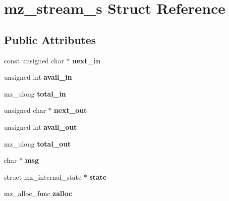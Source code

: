 \hypertarget{structmz__stream__s}{}\section{mz\+\_\+stream\+\_\+s Struct Reference}
\label{structmz__stream__s}
\subsection*{Public Attributes}
\begin{DoxyCompactItemize}
\item 
\mbox{\label{structmz__stream__s_aa75ed42cc83b0f74d7fcce6299439307}} 
const unsigned char $\ast$ {\bfseries next\+\_\+in}
\item 
\mbox{\label{structmz__stream__s_aafcd4c220622ede6d54015f1fbdadd9e}} 
unsigned int {\bfseries avail\+\_\+in}
\item 
\mbox{\label{structmz__stream__s_abfa083eb7707360c33389ec12fadf376}} 
mz\+\_\+ulong {\bfseries total\+\_\+in}
\item 
\mbox{\label{structmz__stream__s_a2c569383efce3b9d9e7c02e3e03941bc}} 
unsigned char $\ast$ {\bfseries next\+\_\+out}
\item 
\mbox{\label{structmz__stream__s_a9092fed61f7be520fb1bbcf152905ee8}} 
unsigned int {\bfseries avail\+\_\+out}
\item 
\mbox{\label{structmz__stream__s_a5cf2c15cc49a99ee7d541375798a3e27}} 
mz\+\_\+ulong {\bfseries total\+\_\+out}
\item 
\mbox{\label{structmz__stream__s_ad4095b25455e382787dc06d20157e05f}} 
char $\ast$ {\bfseries msg}
\item 
\mbox{\label{structmz__stream__s_a935cdb239d37161b5a5e6eda1e047df6}} 
struct mz\+\_\+internal\+\_\+state $\ast$ {\bfseries state}
\item 
\mbox{\label{structmz__stream__s_abbd8109a7f88713f39b9e3046a223ef2}} 
mz\+\_\+alloc\+\_\+func {\bfseries zalloc}

\end{DoxyCompactItemize}
